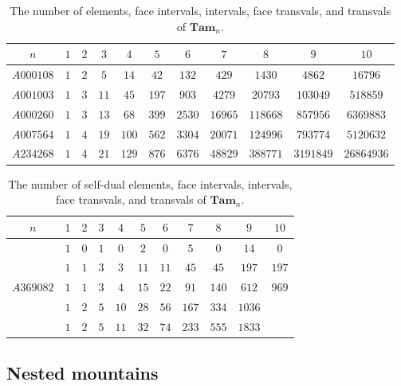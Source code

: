\documentclass[leqno, 12pt]{amsart}
\numberwithin{equation}{section}
\newcommand{\Tam}{\mathbf{Tam}}
\numberwithin{equation}{section}
\theoremstyle{remark}
\begin{document}
	\begin{table}[H]
		\centering
		\begin{tabular}{ccccccccccc}
		\toprule
		   $n$ & $1$& $2$ &$3$ & $4$ & $5$ & $6$ & $7$ & $8$ & $9$ & $10$  \\ \midrule 
			$A000108$ & $1$ & $2$ & $5$ & $14$ & $42$ & $132$ & $429$ & $1430$ & $4862$ & $16796$  \\ \midrule 
			$A001003$ & $1$ & $3$ & $11$ & $45$ & $197$ & $903$ & $4279$ & $20793$ & $103049$ & $518859$ \\  \midrule
		   $A000260$ & $1$ & $3$ & $13$ & $68$ & $399$ & $2530$ & $16965$ & $118668$ &$857956$ & $6369883$  \\ \midrule 
			$A007564$ & $1$ & $4$ & $19$ & $100$ & $562$ & $3304$ & $20071$ & $124996$ & $793774$ & $5120632$  \\ \midrule 
		    $A234268$ & $1$ & $4$ & $21$ & $129$ & $876$ & $6376$ & $48829$ & $388771$ & $3191849$ & $26864936$  \\  \bottomrule
		\end{tabular}
		\caption{\centering The number of elements, face intervals, intervals, face transvals, and transvals of $\Tam_n$.}
	\end{table}
	
	
	\begin{table}[H]
		\centering
		\begin{tabular}{ccccccccccc}
		\toprule
		   $n$ & $1$& $2$ &$3$ & $4$ & $5$ & $6$ & $7$ & $8$ & $9$ & $10$  \\ \midrule 
		   		 & $1$ & $0$ & $1$ & $0$ & $2$ & $0$ & $5$ & $0$ & $14$ & $0$  \\  \midrule
			 & $1$ & $1$ & $3$ & $3$ & $11$ & $11$ & $45$ & $45$ & $197$ & $197$ \\  \midrule
		   $A369082$ & $1$ & $1$ & $3$ & $4$ & $15$ & $22$ & $91$ & $140$ &$612$ & $969$  \\ \midrule 
			 & $1$ & $2$ & $5$ & $10$ & $28$ & $56$ & $167$ & $334$ & $1036$ &  \\ \midrule 
			& $1$ & $2$ & $5$ & $11$ & $32$ & $74$ & $233$ & $555$ & $1833$ &  \\ \bottomrule

		\end{tabular}
		\caption{\centering The number of self-dual elements, face intervals, intervals, face transvals, and transvals of $\Tam_n$.}
	\end{table}
	
	\subsection{Nested mountains}
	
\end{document}
